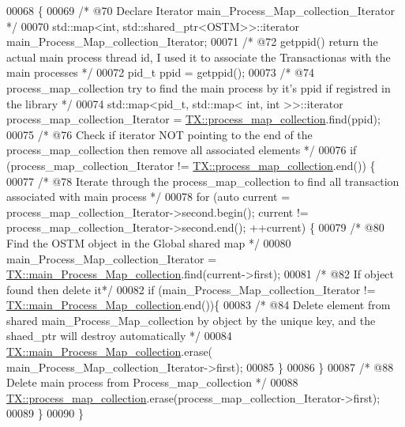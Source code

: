 \begin{DoxyCode}
00068                    \{
00069     \textcolor{comment}{/* @70 Declare Iterator main\_Process\_Map\_collection\_Iterator */}
00070     std::map<int, std::shared\_ptr<OSTM>>::iterator main\_Process\_Map\_collection\_Iterator;
00071     \textcolor{comment}{/* @72 getppid() return the actual main process thread id, I used it to associate the Transactionas
       with the main processes */}
00072     pid\_t ppid = getppid();
00073     \textcolor{comment}{/* @74 process\_map\_collection try to find the main process by it's ppid if registred in the library */}
00074     std::map<pid\_t, std::map< int, int >>::iterator process\_map\_collection\_Iterator = 
      \hyperlink{class_t_x_a2e3cd2f52fd93cf6ef3eb3c1cb830b9f_a2e3cd2f52fd93cf6ef3eb3c1cb830b9f}{TX::process\_map\_collection}.find(ppid);
00075     \textcolor{comment}{/* @76 Check if iterator NOT pointing to the end of the process\_map\_collection then remove all
       associated elements */}
00076     \textcolor{keywordflow}{if} (process\_map\_collection\_Iterator != \hyperlink{class_t_x_a2e3cd2f52fd93cf6ef3eb3c1cb830b9f_a2e3cd2f52fd93cf6ef3eb3c1cb830b9f}{TX::process\_map\_collection}.end()) \{
00077         \textcolor{comment}{/* @78 Iterate through the process\_map\_collection to find all transaction associated with main
       process */}
00078         \textcolor{keywordflow}{for} (\textcolor{keyword}{auto} current = process\_map\_collection\_Iterator->second.begin(); current != 
      process\_map\_collection\_Iterator->second.end(); ++current) \{
00079             \textcolor{comment}{/* @80 Find the OSTM object in the Global shared map */}
00080             main\_Process\_Map\_collection\_Iterator = 
      \hyperlink{class_t_x_a1a45d726894190695314464d7cd97c29_a1a45d726894190695314464d7cd97c29}{TX::main\_Process\_Map\_collection}.find(current->first);
00081             \textcolor{comment}{/* @82 If object found then delete it*/}
00082             \textcolor{keywordflow}{if} (main\_Process\_Map\_collection\_Iterator != 
      \hyperlink{class_t_x_a1a45d726894190695314464d7cd97c29_a1a45d726894190695314464d7cd97c29}{TX::main\_Process\_Map\_collection}.end())\{
00083                 \textcolor{comment}{/* @84 Delete element from shared main\_Process\_Map\_collection by object by the unique key,
       and the shaed\_ptr will destroy automatically */}
00084                 \hyperlink{class_t_x_a1a45d726894190695314464d7cd97c29_a1a45d726894190695314464d7cd97c29}{TX::main\_Process\_Map\_collection}.erase(
      main\_Process\_Map\_collection\_Iterator->first);      
00085             \}
00086         \}
00087         \textcolor{comment}{/* @88 Delete main process from Process\_map\_collection */}
00088         \hyperlink{class_t_x_a2e3cd2f52fd93cf6ef3eb3c1cb830b9f_a2e3cd2f52fd93cf6ef3eb3c1cb830b9f}{TX::process\_map\_collection}.erase(process\_map\_collection\_Iterator->first);
00089     \}
00090 \}
\end{DoxyCode}


